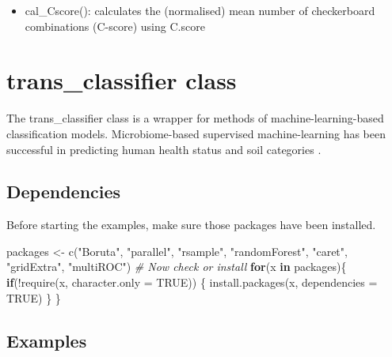 \documentclass[
]{book}
\newenvironment{Shaded}{\begin{snugshade}}{\end{snugshade}}
\newcommand{\AttributeTok}[1]{\textcolor[rgb]{0.77,0.63,0.00}{#1}}
\newcommand{\CommentTok}[1]{\textcolor[rgb]{0.56,0.35,0.01}{\textit{#1}}}
\newcommand{\ConstantTok}[1]{\textcolor[rgb]{0.00,0.00,0.00}{#1}}
\newcommand{\ControlFlowTok}[1]{\textcolor[rgb]{0.13,0.29,0.53}{\textbf{#1}}}
\newcommand{\FunctionTok}[1]{\textcolor[rgb]{0.00,0.00,0.00}{#1}}
\newcommand{\NormalTok}[1]{#1}
\newcommand{\OtherTok}[1]{\textcolor[rgb]{0.56,0.35,0.01}{#1}}
\newcommand{\SpecialCharTok}[1]{\textcolor[rgb]{0.00,0.00,0.00}{#1}}
\newcommand{\StringTok}[1]{\textcolor[rgb]{0.31,0.60,0.02}{#1}}
\providecommand{\tightlist}{%
  \setlength{\itemsep}{0pt}\setlength{\parskip}{0pt}}
\begin{document}
\begin{itemize}
\tightlist
\item
  cal\_Cscore(): calculates the (normalised) mean number of checkerboard combinations (C-score) using C.score
\end{itemize}

\hypertarget{trans_classifier-class}{%
\section{trans\_classifier class}\label{trans_classifier-class}}

The trans\_classifier class is a wrapper for methods of machine-learning-based classification models.
Microbiome-based supervised machine-learning has been successful in predicting human health status \citep{Poore_Microbiome_2020}
and soil categories \citep{Wilhelm_Predicting_2021}.

\hypertarget{dependencies}{%
\subsection{Dependencies}\label{dependencies}}

Before starting the examples, make sure those packages have been installed.

\begin{Shaded}
\begin{Highlighting}[]
\NormalTok{packages }\OtherTok{\textless{}{-}} \FunctionTok{c}\NormalTok{(}\StringTok{"Boruta"}\NormalTok{, }\StringTok{"parallel"}\NormalTok{, }\StringTok{"rsample"}\NormalTok{, }\StringTok{"randomForest"}\NormalTok{, }\StringTok{"caret"}\NormalTok{, }\StringTok{"gridExtra"}\NormalTok{, }\StringTok{"multiROC"}\NormalTok{)}
\CommentTok{\# Now check or install}
\ControlFlowTok{for}\NormalTok{(x }\ControlFlowTok{in}\NormalTok{ packages)\{}
    \ControlFlowTok{if}\NormalTok{(}\SpecialCharTok{!}\FunctionTok{require}\NormalTok{(x, }\AttributeTok{character.only =} \ConstantTok{TRUE}\NormalTok{)) \{}
        \FunctionTok{install.packages}\NormalTok{(x, }\AttributeTok{dependencies =} \ConstantTok{TRUE}\NormalTok{)}
\NormalTok{    \}}
\NormalTok{\}}
\end{Highlighting}
\end{Shaded}

\hypertarget{examples}{%
\subsection{Examples}\label{examples}}
\end{document}
